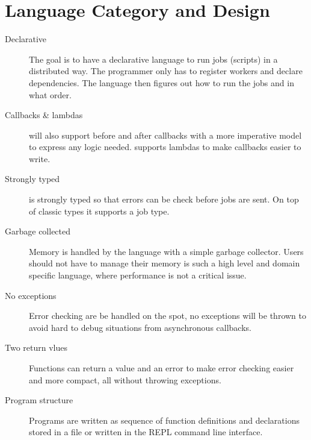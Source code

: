 \section{Language Category and Design}
\label{sect:desg}
\begin{description}
\item[Declarative] The goal is to have a declarative language to run jobs
(scripts) in a distributed way. The programmer only has to register workers and
declare dependencies. The language then figures out how to run the jobs and in
what order.
\item[Callbacks \& lambdas] \lang{} will also support before and after callbacks
with a more imperative model to express any logic needed. \lang{} supports
lambdas to make callbacks easier to write.
\item[Strongly typed] \lang{} is strongly typed so that errors can be check
before jobs are sent. On top of classic types it supports a job type.
\item[Garbage collected] Memory is handled by the language with a simple
garbage collector. Users should not have to manage their memory is such a high
level and domain specific language, where performance is not a critical issue.
\item[No exceptions] Error checking are be handled on the spot, no exceptions
will be thrown to avoid hard to debug situations from asynchronous callbacks.
\item[Two return vlues] Functions can return a value and an error to make error
checking easier and more compact, all without throwing exceptions.
\item[Program structure] Programs are written as sequence of function
definitions and declarations stored in a file or written in the REPL command line
interface.
\end{description}
